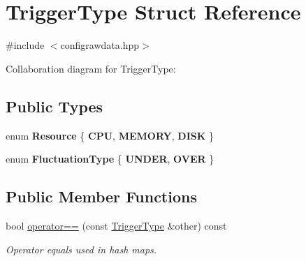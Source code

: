 \hypertarget{structTriggerType}{}\section{Trigger\+Type Struct Reference}
\label{structTriggerType}


{\ttfamily \#include $<$configrawdata.\+hpp$>$}



Collaboration diagram for Trigger\+Type\+:
\subsection*{Public Types}
\begin{DoxyCompactItemize}
\item 
enum {\bfseries Resource} \{ {\bfseries C\+PU}, 
{\bfseries M\+E\+M\+O\+RY}, 
{\bfseries D\+I\+SK}
 \}\hypertarget{structTriggerType_af482b9023d9bb83021538f2ac863b641}{}\label{structTriggerType_af482b9023d9bb83021538f2ac863b641}

\item 
enum {\bfseries Fluctuation\+Type} \{ {\bfseries U\+N\+D\+ER}, 
{\bfseries O\+V\+ER}
 \}\hypertarget{structTriggerType_a03fc94031373f12d204d97890b7e8fce}{}\label{structTriggerType_a03fc94031373f12d204d97890b7e8fce}

\end{DoxyCompactItemize}
\subsection*{Public Member Functions}
\begin{DoxyCompactItemize}
\item 
bool \hyperlink{structTriggerType_aec3b8c200c49716be8bc21f11dad519f}{operator==} (const \hyperlink{structTriggerType}{Trigger\+Type} \&other) const \hypertarget{structTriggerType_aec3b8c200c49716be8bc21f11dad519f}{}\label{structTriggerType_aec3b8c200c49716be8bc21f11dad519f}

\begin{DoxyCompactList}\small\item\em Operator equals used in hash maps. \end{DoxyCompactList}\end{DoxyCompactItemize}
